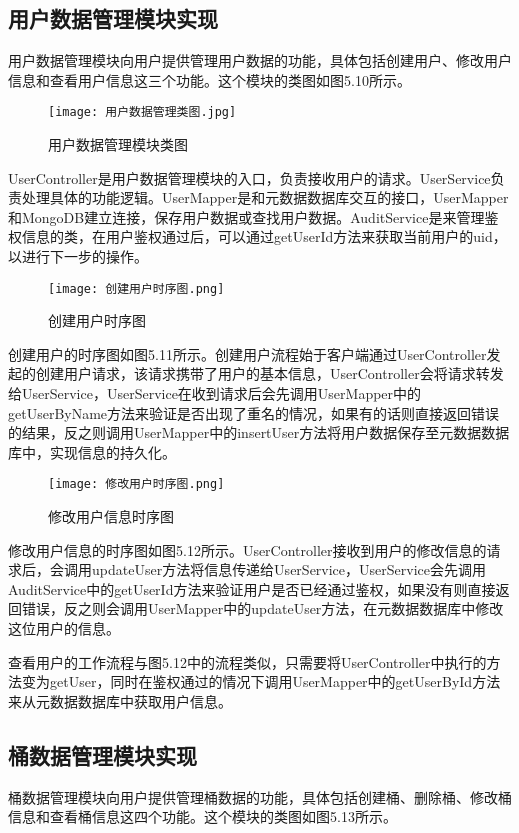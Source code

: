 \subsection{用户数据管理模块实现}
用户数据管理模块向用户提供管理用户数据的功能，具体包括创建用户、修改用户信息和查看用户信息这三个功能。这个模块的类图如图5.10所示。

\begin{figure}
  \centering
  \texttt{[image: 用户数据管理类图.jpg]}
  \caption{用户数据管理模块类图}
\end{figure}

UserController是用户数据管理模块的入口，负责接收用户的请求。UserService负责处理具体的功能逻辑。UserMapper是和元数据数据库交互的接口，UserMapper和MongoDB建立连接，保存用户数据或查找用户数据。AuditService是来管理鉴权信息的类，在用户鉴权通过后，可以通过getUserId方法来获取当前用户的uid，以进行下一步的操作。

\begin{figure}
  \centering
  \texttt{[image: 创建用户时序图.png]}
  \caption{创建用户时序图}
\end{figure}

创建用户的时序图如图5.11所示。创建用户流程始于客户端通过UserController发起的创建用户请求，该请求携带了用户的基本信息，UserController会将请求转发给UserService，UserService在收到请求后会先调用UserMapper中的getUserByName方法来验证是否出现了重名的情况，如果有的话则直接返回错误的结果，反之则调用UserMapper中的insertUser方法将用户数据保存至元数据数据库中，实现信息的持久化。

\begin{figure}
  \centering
  \texttt{[image: 修改用户时序图.png]}
  \caption{修改用户信息时序图}
\end{figure}

修改用户信息的时序图如图5.12所示。UserController接收到用户的修改信息的请求后，会调用updateUser方法将信息传递给UserService，UserService会先调用AuditService中的getUserId方法来验证用户是否已经通过鉴权，如果没有则直接返回错误，反之则会调用UserMapper中的updateUser方法，在元数据数据库中修改这位用户的信息。

查看用户的工作流程与图5.12中的流程类似，只需要将UserController中执行的方法变为getUser，同时在鉴权通过的情况下调用UserMapper中的getUserById方法来从元数据数据库中获取用户信息。

\subsection{桶数据管理模块实现}
桶数据管理模块向用户提供管理桶数据的功能，具体包括创建桶、删除桶、修改桶信息和查看桶信息这四个功能。这个模块的类图如图5.13所示。

